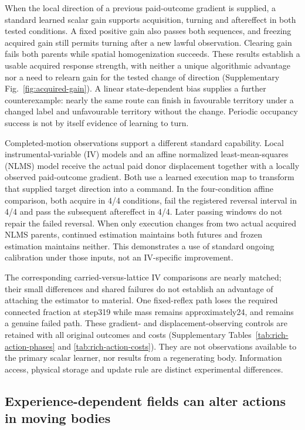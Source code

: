 When the local direction of a previous paid-outcome gradient is supplied, a standard learned scalar gain supports acquisition, turning and aftereffect in both tested conditions. A fixed positive gain also passes both sequences, and freezing acquired gain still permits turning after a new lawful observation. Clearing gain fails both parents while spatial homogenization succeeds. These results establish a usable acquired response strength, with neither a unique algorithmic advantage nor a need to relearn gain for the tested change of direction (Supplementary Fig.~\ref{fig:acquired-gain}). A linear state-dependent bias supplies a further counterexample: nearly the same route can finish in favourable territory under a changed label and unfavourable territory without the change. Periodic occupancy success is not by itself evidence of learning to turn.

Completed-motion observations support a different standard capability. Local instrumental-variable (IV) models and an affine normalized least-mean-squares (NLMS) model receive the actual paid donor displacement together with a locally observed paid-outcome gradient. Both use a learned execution map to transform that supplied target direction into a command. In the four-condition affine comparison, both acquire in 4/4 conditions, fail the registered reversal interval in 4/4 and pass the subsequent aftereffect in 4/4. Later passing windows do not repair the failed reversal. When only execution changes from two actual acquired NLMS parents, continued estimation maintains both futures and frozen estimation maintains neither. This demonstrates a use of standard ongoing calibration under those inputs, not an IV-specific improvement.

The corresponding carried-versus-lattice IV comparisons are nearly matched; their small differences and shared failures do not establish an advantage of attaching the estimator to material. One fixed-reflex path loses the required connected fraction at step319 while mass remains approximately24, and remains a genuine failed path. These gradient- and displacement-observing controls are retained with all original outcomes and costs (Supplementary Tables~\ref{tab:rich-action-phases} and \ref{tab:rich-action-costs}). They are not observations available to the primary scalar learner, nor results from a regenerating body. Information access, physical storage and update rule are distinct experimental differences.

\subsection*{Experience-dependent fields can alter actions in moving bodies}

